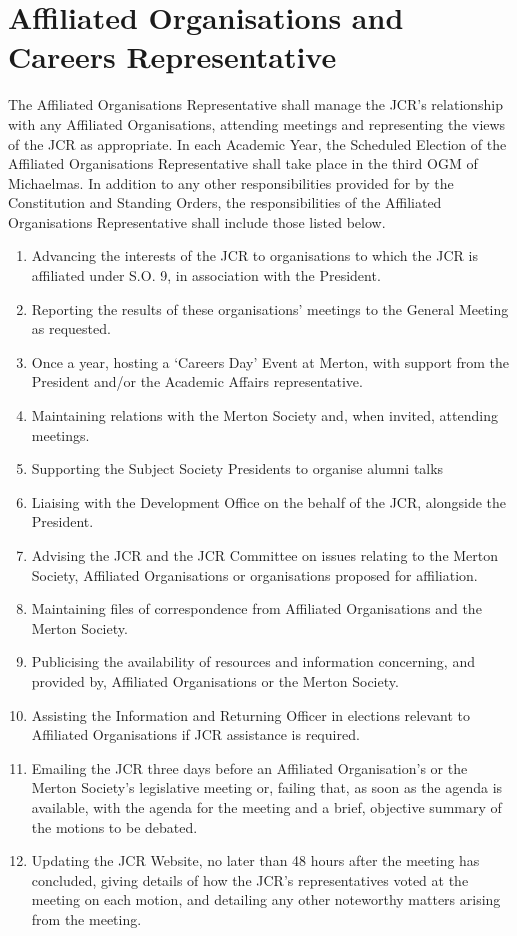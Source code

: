 \section{Affiliated Organisations and Careers Representative}
\npara The Affiliated Organisations Representative shall manage the JCR's relationship with any Affiliated Organisations, attending meetings and representing the views of the JCR as appropriate.
\npara In each Academic Year, the Scheduled Election of the Affiliated Organisations Representative shall take place in the third OGM of Michaelmas.
\npara In addition to any other responsibilities provided for by the Constitution and Standing Orders, the responsibilities of the Affiliated Organisations Representative shall include those listed below.
\begin{enumerate}
	\item Advancing the interests of the JCR to organisations to which the JCR is affiliated under S.O. 9, in association with the President.     
	\item Reporting the results of these organisations' meetings to the General Meeting as requested.
	\item Once a year, hosting a `Careers Day' Event at Merton, with support from the President and/or the Academic Affairs representative.
	\item Maintaining relations with the Merton Society and, when invited, attending meetings.
	\item Supporting the Subject Society Presidents to organise alumni talks
	\item Liaising with the Development Office on the behalf of the JCR, alongside the President.
	\item Advising the JCR and the JCR Committee on issues relating to the Merton Society, Affiliated Organisations or organisations proposed for affiliation.
	\item Maintaining files of correspondence from Affiliated Organisations and the Merton Society.
	\item Publicising the availability of resources and information concerning, and provided by, Affiliated Organisations or the Merton Society.
	\item Assisting the Information and Returning Officer in elections relevant to Affiliated Organisations if JCR assistance is required.
	\item Emailing the JCR three days before an Affiliated Organisation's or the Merton Society's legislative meeting or, failing that, as soon as the agenda is available, with the agenda for the meeting and a brief, objective summary of the motions to be debated.
	\item Updating the JCR Website, no later than 48 hours after the meeting has concluded, giving details of how the JCR's representatives voted at the meeting on each motion, and detailing any other noteworthy matters arising from the meeting.
\end{enumerate}
